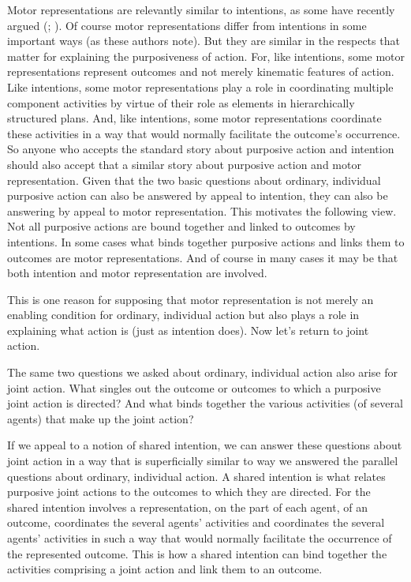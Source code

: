 \documentclass[12pt,\papersize]{extarticle}
\begin{document}
Motor representations are relevantly similar to intentions,
as some have recently argued (\citealp[pp.\ 189-90]{pacherie:2008_action}; \citealp{butterfill:2012_intention}).
Of course motor representations differ from intentions in some important ways (as these authors note).
But they are similar in the respects that matter for explaining the purposiveness of action.
For, like intentions, some motor representations represent outcomes and not merely kinematic features of action.
Like intentions, some motor representations play a role in coordinating multiple  component activities by virtue of their role as elements in hierarchically structured plans.
And, like intentions, some motor representations coordinate these activities in a way that would normally facilitate the outcome’s occurrence.
So anyone who accepts the standard story about purposive action and intention
should also accept that a similar story about purposive action and motor representation.
Given that the two basic questions about ordinary, individual purposive action can also be answered by appeal to intention,
they can also be answering by appeal to motor representation.
This motivates the following view.
Not all purposive actions are bound together and linked to outcomes by intentions. 
In some cases what binds together purposive actions and links them to outcomes are motor representations.
And of course in many cases it may be that both intention and motor representation are involved.

This is one reason for supposing that motor representation is not merely an enabling condition for ordinary, individual action but also plays a role in explaining what action is (just as intention does).
Now let’s return to joint action.

The same two questions we asked about ordinary, individual action also arise for joint action.
What singles out the outcome or outcomes to which a purposive joint action is directed?
And what binds together the various activities (of several agents) that make up the joint action?

If we appeal to a notion of shared intention,
we can answer these questions about joint action in a way that is superficially similar to way we answered the parallel questions about ordinary, individual action.
A shared intention is what relates purposive joint actions to the outcomes to which they are directed.
For the shared intention 
involves a representation, on the part of each agent, of an outcome,
coordinates the several agents’ activities
and 
coordinates the several agents’ activities in such a way that would normally facilitate the occurrence of the represented outcome.
This is how a shared intention can bind together the activities comprising a joint action and link them to an outcome.
\end{document}
